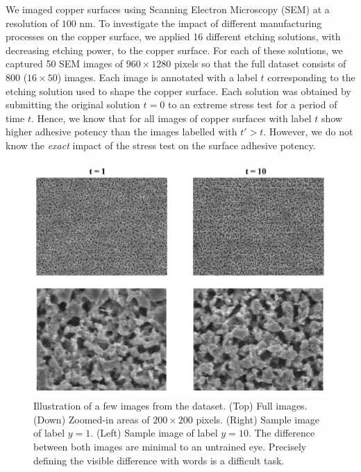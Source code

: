 \documentclass[10pt,twocolumn,letterpaper]{article}
\begin{document}
We imaged copper surfaces using Scanning Electron Microscopy (SEM) at a resolution of $100$ nm.
To investigate the impact of different manufacturing processes on the copper surface, 
we applied 16 different etching solutions, with decreasing etching power, to the copper surface.
For each of these solutions, we captured 50 SEM images of $960 \times 1280$ pixels so that the full dataset
consists of $800$ ($16 \times 50$) images.
Each image is annotated with a label $t$ corresponding to the etching solution used to shape the copper surface.
Each solution was obtained by submitting the original solution $t=0$ to an extreme stress test for a period of time $t$.
Hence, we know that for all images of copper surfaces with label $t$ show higher adhesive potency than the images labelled with $t' > t$. 
However, we do not know the \textit{exact} impact of the stress test on the surface adhesive potency.

\begin{figure}[h]
\centering
\includegraphics[width=0.9\linewidth]{"./figures/Figure3"}
\caption{
Illustration of a few images from the dataset. 
(Top) Full images. 
(Down) Zoomed-in areas of $200 \times 200$ pixels. 
(Right) Sample image of label $y=1$. 
(Left) Sample image of label $y=10$. 
The difference between both images are minimal to an untrained eye.
Precisely defining the visible difference with words is a difficult task.
}
\end{figure}
\end{document}
